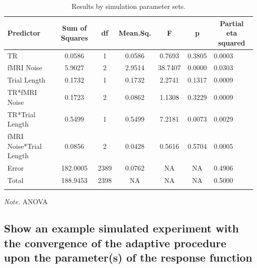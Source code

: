 \documentclass[
  english,
  man,floatsintext]{apa6}
\begin{document}
\begin{table}[tbp]

\begin{center}
\begin{threeparttable}

\caption{\label{tab:unnamed-chunk-2}Results by simulation parameter sets.}

\begin{tabular}{lcccccl}
\toprule
Predictor & \multicolumn{1}{c}{Sum of Squares} & \multicolumn{1}{c}{df} & \multicolumn{1}{c}{Mean.Sq.} & \multicolumn{1}{c}{F} & \multicolumn{1}{c}{p} & \multicolumn{1}{c}{Partial eta squared}\\
\midrule
TR & 0.0586 & 1 & 0.0586 & 0.7693 & 0.3805 & 0.0003\\
fMRI Noise & 5.9027 & 2 & 2.9514 & 38.7407 & 0.0000 & 0.0303\\
Trial Length & 0.1732 & 1 & 0.1732 & 2.2741 & 0.1317 & 0.0009\\
TR*fMRI Noise & 0.1723 & 2 & 0.0862 & 1.1308 & 0.3229 & 0.0009\\
TR*Trial Length & 0.5499 & 1 & 0.5499 & 7.2181 & 0.0073 & 0.0029\\
fMRI Noise*Trial Length & 0.0856 & 2 & 0.0428 & 0.5616 & 0.5704 & 0.0005\\
Error & 182.0005 & 2389 & 0.0762 & NA & NA & 0.4906\\
Total & 188.9453 & 2398 & NA & NA & NA & 0.5000\\
\bottomrule
\addlinespace
\end{tabular}

\begin{tablenotes}[para]
\normalsize{\textit{Note.} ANOVA}
\end{tablenotes}

\end{threeparttable}
\end{center}

\end{table}

\hypertarget{show-an-example-simulated-experiment-with-the-convergence-of-the-adaptive-procedure-upon-the-parameters-of-the-response-function}{%
\subsection{Show an example simulated experiment with the convergence of the adaptive procedure upon the parameter(s) of the response function}\label{show-an-example-simulated-experiment-with-the-convergence-of-the-adaptive-procedure-upon-the-parameters-of-the-response-function}}
\end{document}

